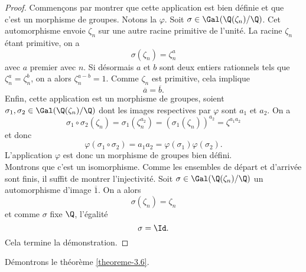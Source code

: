 \begin{proof}
	Commençons par montrer que cette application est bien définie et que c'est un morphisme de groupes. Notons la $\varphi$. Soit $\sigma\in \Gal(\Q(\zeta_n)/\Q)$. Cet automorphisme envoie $\zeta_n$ sur une autre racine primitive de l'unité. La racine $\zeta_n$ étant primitive,  on a \[\sigma(\zeta_n) = \zeta_n^a\] avec $a$ premier avec $n$. Si désormais $a$ et $b$ sont deux entiers rationnels tels que $\zeta_n^a = \zeta_n^b$, on a alors $\zeta_n^{a-b} = 1$. Comme $\zeta_n$ est primitive, cela implique \[\overline{a} = \overline{b}.\] Enfin, cette application est un morphisme de groupes, soient $\sigma_1, \sigma_2 \in \Gal(\Q(\zeta_n)/\Q)$ dont les images respectives par $\varphi$ sont $a_1$ et $a_2$. On a \[\sigma_1\circ \sigma_2(\zeta_n) = \sigma_1(\zeta_n^{a_2}) = (\sigma_1(\zeta_n))^{a_2} = \zeta^{a_1 a_2}\] et donc \[\varphi(\sigma_1\circ\sigma_2) = a_1 a_2 = \varphi(\sigma_1)\varphi(\sigma_2).\] L'application $\varphi$ est donc un morphisme de groupes bien défini. \\

	Montrons que c'est un isomorphisme. Comme les ensembles de départ et d'arrivée sont finis, il suffit de montrer l'injectivité. Soit $\sigma\in \Gal(\Q(\zeta_n)/\Q)$ un automorphisme d'image $\overline{1}$. On a alors \[\sigma(\zeta_n) = \zeta_n\] et comme $\sigma$ fixe $\Q$, l'égalité \[\sigma = \Id.\] Cela termine la démonstration.
\end{proof}


Démontrons le théorème \ref{theoreme-3.6}.

